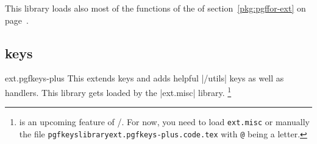 This library loads also most of the functions of the
 of section~\ref{pkg:pgffor-ext}
on page~\pageref{pkg:pgffor-ext}.
%
%


\subsection{\pgfname keys}
\begin{pgfkeyslibrary}{ext.pgfkeys-plus}
  This extends \pgfname keys and adds helpful |/utils| keys as well as handlers.
  This library gets loaded by the |ext.misc| library.%
  \footnote{\texttt{\string\usepgfkeyslibrary} is an upcoming feature of \pgfname/\tikzname.
    For now, you need to load \texttt{ext.misc}
    or manually \texttt{\string} the file \texttt{pgfkeyslibraryext.pgfkeys-plus.code.tex}
    with \texttt{@} being a letter.}
\end{pgfkeyslibrary}

